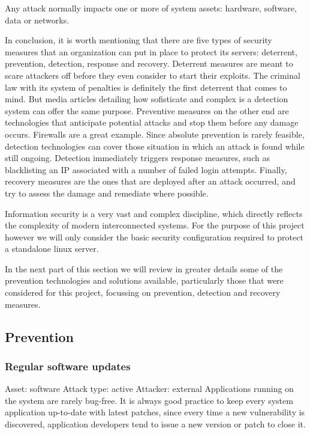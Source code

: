 Any attack normally impacts one or more of system assets: hardware, software,
data or networks.

In conclusion, it is worth mentioning that there are five types of security
measures that an organization can put in place to protect its servers:
deterrent, prevention, detection, response and recovery. Deterrent measures are
meant to scare attackers off before they even consider to start their exploits.
The criminal law with its system of penalties is definitely the first deterrent
that comes to mind. But media articles detailing how sofisticate and complex is
a detection system can offer the same purpose. Preventive measures on the other
end are technologies that anticipate potential attacks and stop them before any
damage occurs. Firewalls are a great example. Since absolute prevention
is rarely feasible, detection technologies can cover those situation in
which an attack is found while still ongoing. Detection immediately
triggers response measures, such as blacklisting an IP associated with a
number of failed login attempts. Finally, recovery measures are the ones that
are deployed after an attack occurred, and try to assess the damage and
remediate where possible.

Information security is a very vast and complex discipline, which
directly reflects the complexity of modern interconnected systems. For the
purpose of this project however we will only consider the basic security
configuration required to protect a standalone linux server.

In the next part of this section we will review in greater details some of the
prevention technologies and solutions available, particularly those that were
considered for this project, focussing on prevention, detection and
recovery measures.

\subsection{Prevention}

\subsubsection{Regular software updates}
Asset: software
Attack type: active
Attacker: external
Applications running on the system are rarely bug-free. It is always good
practice to keep every system application up-to-date with latest patches, since
every time a new vulnerability is discovered, application developers tend
to issue a new version or patch to close it.

